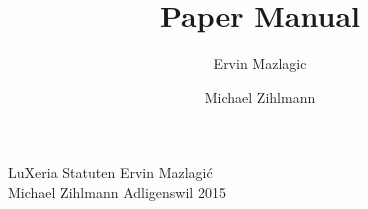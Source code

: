 \documentclass[a4paper,10pt,]{article}
\author{Ervin Mazlagic \and Michael Zihlmann}
\title{Paper Manual}
\begin{document}
         {LuXeria Statuten}                     %
         {Ervin Mazlagi\'c\\Michael Zihlmann}   %
         {Adligenswil}                          %
         {2015}                                 %

\tableofcontents
\newpage




\end{document}
